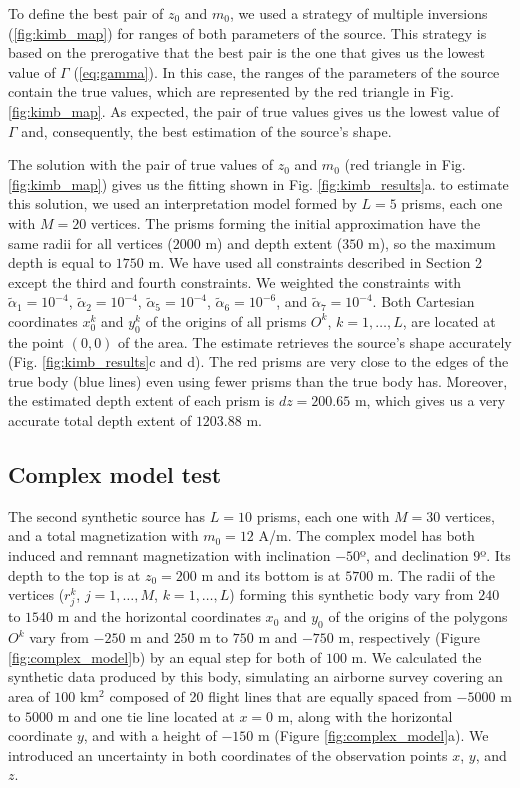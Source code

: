 To define the best pair of $z_0$ and $ m_0 $, we used a strategy of multiple inversions (\ref{fig:kimb_map}) for ranges of both parameters of the source. This strategy is based on the prerogative that the best pair is the one that gives us the lowest value of $\Gamma$ (\ref{eq:gamma}). In this case, the ranges of the parameters of the source contain the true values, which are represented by the red triangle in Fig. \ref{fig:kimb_map}. As expected, the pair of true values gives us the lowest value of $\Gamma$ and, consequently, the best estimation of the source's shape.

The solution with the pair of true values of $z_0$ and $ m_0 $ (red triangle in Fig. \ref{fig:kimb_map}) gives us the fitting shown in Fig. \ref{fig:kimb_results}a. to estimate this solution, we used an interpretation model formed by $L=5$ prisms, each one with $M=20$ vertices. The prisms forming the initial approximation have the same radii for all vertices ($2000$ m) and depth extent ($350$ m), so the maximum depth is equal to $1750$ m. We have used all constraints described in Section 2 except the third and fourth constraints. We weighted the constraints with $\tilde{\alpha}_1 = 10^{-4}$, $\tilde{\alpha}_2 = 10^{-4}$, $\tilde{\alpha}_5 = 10^{-4}$, $\tilde{\alpha}_6 = 10^{-6}$, and $\tilde{\alpha}_7 = 10^{-4}$. Both Cartesian coordinates $x_0^k$ and $y_0^k$ of the origins of all prisms $O^k$, $k=1,\dots,L$, are located at the point $(0,0)$ of the area. The estimate retrieves the source's shape accurately (Fig. \ref{fig:kimb_results}c and d). The red prisms are very close to the edges of the true body (blue lines) even using fewer prisms than the true body has. Moreover, the estimated depth extent of each prism is $dz = 200.65$ m, which gives us a very accurate total depth extent of $1203.88$ m. 

\subsection{Complex model test}

The second synthetic source has $L=10$ prisms, each one with $M=30$ vertices, and a total magnetization with $m_0 =12$ A/m. The complex model has both induced and remnant magnetization with inclination $-50$º, and declination $9$º. Its depth to the top is at $z_0=200$ m and its bottom is at $5700$ m. The radii of the vertices ($r_j^k$, $j=1,\dots,M$, $k=1,\dots,L$) forming this synthetic body vary from $240$ to $1540$ m and the horizontal coordinates $x_0$ and $y_0$ of the origins of the polygons $O^k$ vary from $-250$ m and $250$ m to $750$ m and $-750$ m, respectively (Figure \ref{fig:complex_model}b) by an equal step for both of $100$ m. We calculated the synthetic data produced by this body, simulating an airborne survey covering an area of $100$ km$^2$ composed of 20 flight lines that are equally spaced from $-5000$ m to $5000$ m and one tie line located at $x=0$ m, along with the horizontal coordinate $y$, and with a height of $-150$ m (Figure \ref{fig:complex_model}a). We introduced an uncertainty in both coordinates of the observation points $x$, $y$, and $z$.

